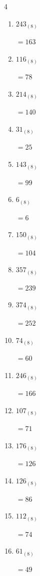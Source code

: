 \begin{multicols}{4}
\begin{enumerate}
        $=197$

  \item $243_{(8)}$

        $=163$

  \item $116_{(8)}$

        $=78$

  \item $214_{(8)}$

        $=140$

  \item $31_{(8)}$

        $=25$

  \item $143_{(8)}$

        $=99$

\columnbreak %

  \item $6_{(8)}$

        $=6$

  \item $150_{(8)}$

        $=104$

  \item $357_{(8)}$

        $=239$

  \item $374_{(8)}$

        $=252$

  \item $74_{(8)}$

        $=60$

  \item $246_{(8)}$

        $=166$

  \item $107_{(8)}$

        $=71$

  \item $176_{(8)}$

        $=126$

  \item $126_{(8)}$

        $=86$

  \item $112_{(8)}$

        $=74$

  \item $61_{(8)}$

        $=49$


\end{enumerate}
\end{multicols}
